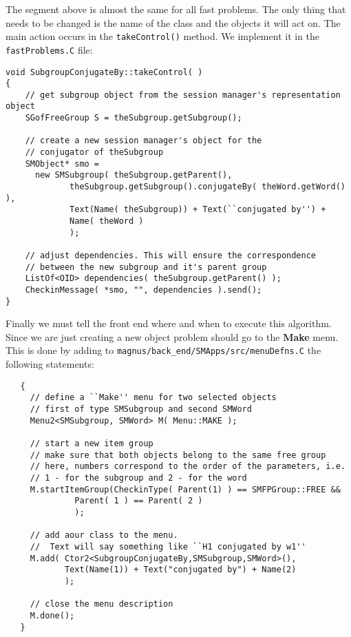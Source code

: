 \documentclass[12pt]{article}
\begin{document}
The segment above is almost the same for all fast problems. The only thing
that needs to be changed is the name of the class and the objects it will
act on. The main action occurs in the {\tt takeControl()} method. We implement
it in the {\tt fastProblems.C} file:
\footnotesize
\begin{verbatim}
void SubgroupConjugateBy::takeControl( )
{
    // get subgroup object from the session manager's representation object
    SGofFreeGroup S = theSubgroup.getSubgroup();

    // create a new session manager's object for the
    // conjugator of theSubgroup
    SMObject* smo =
      new SMSubgroup( theSubgroup.getParent(),
             theSubgroup.getSubgroup().conjugateBy( theWord.getWord() ),
             Text(Name( theSubgroup)) + Text(``conjugated by'') +
             Name( theWord )
             );

    // adjust dependencies. This will ensure the correspondence
    // between the new subgroup and it's parent group
    ListOf<OID> dependencies( theSubgroup.getParent() );
    CheckinMessage( *smo, "", dependencies ).send();
}
\end{verbatim}
\normalsize

Finally we must tell the front end where and when to execute
this algorithm. Since we are just creating a new object problem
should go to the \textbf{Make} menu.
This is done by adding to {\tt magnus/back\_end/SMApps/src/menuDefns.C}
the following statements:
\footnotesize
\begin{verbatim}
   {
     // define a ``Make'' menu for two selected objects
     // first of type SMSubgroup and second SMWord
     Menu2<SMSubgroup, SMWord> M( Menu::MAKE );

     // start a new item group
     // make sure that both objects belong to the same free group
     // here, numbers correspond to the order of the parameters, i.e.
     // 1 - for the subgroup and 2 - for the word
     M.startItemGroup(CheckinType( Parent(1) ) == SMFPGroup::FREE &&
              Parent( 1 ) == Parent( 2 )
              );

     // add aour class to the menu.
     //  Text will say something like ``H1 conjugated by w1''
     M.add( Ctor2<SubgroupConjugateBy,SMSubgroup,SMWord>(),
            Text(Name(1)) + Text("conjugated by") + Name(2)
            );

     // close the menu description
     M.done();
   }
\end{verbatim}
\normalsize
\end{document}
